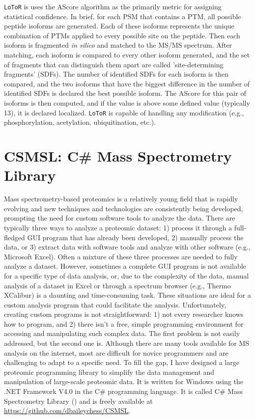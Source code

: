 \texttt{LoToR} is uses the AScore algorithm as the primarily metric for assigning statistical confidence.\cite{ascore} In brief, for each PSM that contains a PTM, all possible peptide isoforms are generated. Each of these isoforms represents the unique combination of PTMs applied to every possible site on the peptide. Then each isoform is fragmented \emph{in silico} and matched to the MS/MS spectrum. After matching, each isoform is compared to every other isoform generated, and the set of fragments that can distinguish them apart are called 'site-determining fragments' (SDFs). The number of identified SDFs for each isoform is then compared, and the two isoforms that have the biggest difference in the number of identified SDFs is declared the best possible isoform. The AScore for this pair of isoforms is then computed, and if the value is above some defined value (typically 13), it is declared localized. \texttt{LoToR} is capable of handling any modification (e.g., phosphorylation, acetylation, ubiquitination, etc.). 

\section{CSMSL: C\# Mass Spectrometry Library}
Mass spectrometry-based proteomics is a relatively young field that is rapidly evolving and new techniques and technologies are consistently being developed, prompting the need for custom software tools to analyze the data. There are typically three ways to analyze a proteomic dataset: 1) process it through a full-fledged GUI program that has already been developed, 2) manually process the data, or 3) extract data with software tools and analyze with other software (e.g., Microsoft Excel). Often a mixture of these three processes are needed to fully analyze a dataset. However, sometimes a complete GUI program is not available for a specific type of data analysis, or, due to the complexity of the data, manual analysis of a dataset in Excel or through a spectrum browser (e.g., Thermo XCalibur) is a daunting and time-consuming task. These situations are ideal for a custom analysis program that could facilitate the analysis. Unfortunately, creating custom programs is not straightforward: 1) not every researcher knows how to program, and 2) there isn't a free, simple programming environment for accessing and manipulating such complex data. The first problem is not easily addressed, but the second one is. Although there are many tools available for MS analysis on the internet, most are difficult for novice programmers and are challenging to adapt to a specific need. To fill the gap, I have designed a large proteomic programming library to simplify the data management and manipulation of large-scale proteomic data. It is written for Windows using the .NET Framework V4.0 in the C\# programming language. It is called C\# Mass Spectrometry Library (\csmsl{}) and is freely available at \url{https://github.com/dbaileychess/CSMSL}.

